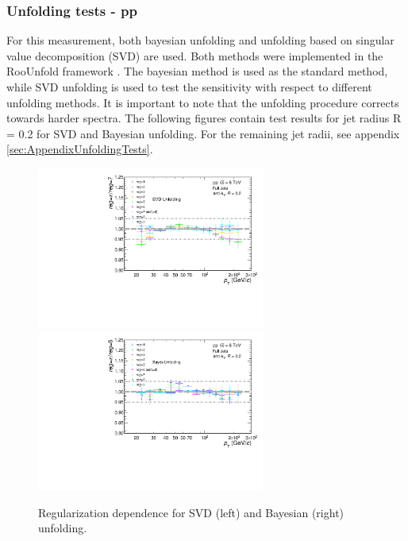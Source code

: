 \documentclass[ALICE]{ALICE_analysis_notes}
\newcommand{\pp}{pp\xspace}
\begin{document}
\subsubsection{Unfolding tests - \pp}
\label{subsec:unfoldingTests}

For this measurement, both bayesian unfolding and unfolding based on singular value decomposition (SVD) are used. Both methods were implemented in the RooUnfold framework \cite{roounfold}. The bayesian method is used as the standard method, while SVD unfolding is used to test the sensitivity with respect to different unfolding methods. It is important to note that the unfolding procedure corrects towards harder spectra. The following figures contain test results for jet radius R = 0.2 for SVD and Bayesian unfolding. For the remaining jet radii, see appendix \ref{sec:AppendixUnfoldingTests}.

\begin{figure}
    \centering
    \begin{multicols}{2}
            \includegraphics[width=7.5cm]{figures/UnfoldingComparisons/Regularizations/RatioRegularizationSvd_R02.pdf}
        \vfill\null 
        \columnbreak
            \includegraphics[width=7.5cm]{figures/UnfoldingComparisons/Regularizations/RatioRegularizationBayes_R02.pdf}
        \vfill\null
    \end{multicols}
    \caption{Regularization dependence for SVD (left) and Bayesian (right) unfolding.}
    \label{fig:RegIter}
\end{figure}
\end{document}
